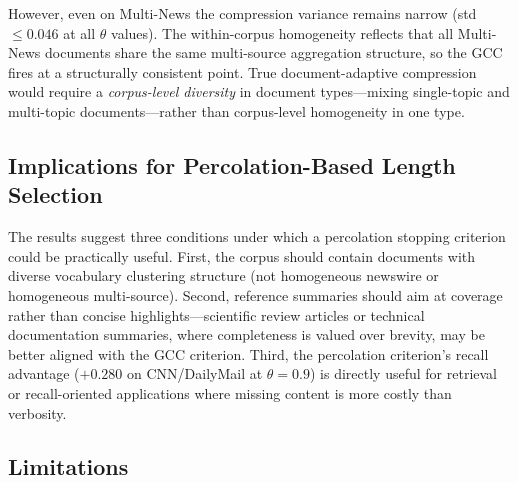 \documentclass[11pt,letterpaper]{article}
\begin{document}
However, even on Multi-News the compression variance remains narrow (std$\le 0.046$ at
all $\theta$ values). The within-corpus homogeneity reflects that all Multi-News documents
share the same multi-source aggregation structure, so the GCC fires at a structurally
consistent point. True document-adaptive compression would require a \emph{corpus-level
diversity} in document types---mixing single-topic and multi-topic documents---rather than
corpus-level homogeneity in one type.

\subsection{Implications for Percolation-Based Length Selection}

The results suggest three conditions under which a percolation stopping criterion could
be practically useful. First, the corpus should contain documents with diverse vocabulary
clustering structure (not homogeneous newswire or homogeneous multi-source). Second,
reference summaries should aim at coverage rather than concise highlights---scientific
review articles or technical documentation summaries, where completeness is valued over
brevity, may be better aligned with the GCC criterion. Third, the percolation criterion's
recall advantage ($+0.280$ on CNN/DailyMail at $\theta{=}0.9$) is directly useful for
retrieval or recall-oriented applications where missing content is more costly than
verbosity.

\subsection{Limitations}
\end{document}
